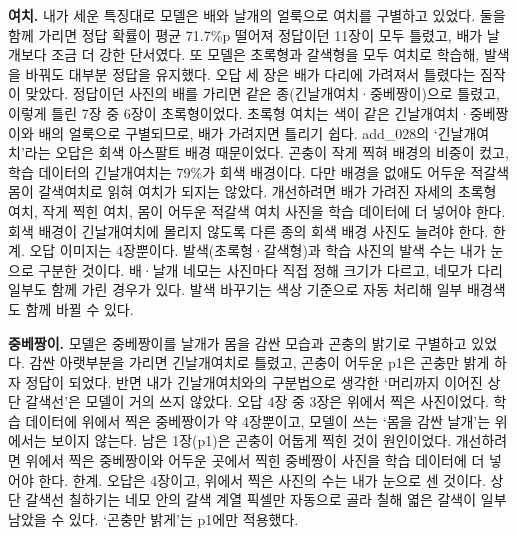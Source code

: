 \documentclass[11pt]{article}
\begin{document}
\textbf{여치.} 내가 세운 특징대로 모델은 배와 날개의 얼룩으로 여치를 구별하고 있었다. 둘을 함께 가리면 정답 확률이 평균 71.7\%p 떨어져 정답이던 11장이 모두 틀렸고, 배가 날개보다 조금 더 강한 단서였다. 또 모델은 초록형과 갈색형을 모두 여치로 학습해, 발색을 바꿔도 대부분 정답을 유지했다.
오답 세 장은 배가 다리에 가려져서 틀렸다는 짐작이 맞았다. 정답이던 사진의 배를 가리면 같은 종(긴날개여치·중베짱이)으로 틀렸고, 이렇게 틀린 7장 중 6장이 초록형이었다. 초록형 여치는 색이 같은 긴날개여치·중베짱이와 배의 얼룩으로 구별되므로, 배가 가려지면 틀리기 쉽다.
add\_028의 `긴날개여치'라는 오답은 회색 아스팔트 배경 때문이었다. 곤충이 작게 찍혀 배경의 비중이 컸고, 학습 데이터의 긴날개여치는 79\%가 회색 배경이다. 다만 배경을 없애도 어두운 적갈색 몸이 갈색여치로 읽혀 여치가 되지는 않았다.
개선하려면 배가 가려진 자세의 초록형 여치, 작게 찍힌 여치, 몸이 어두운 적갈색 여치 사진을 학습 데이터에 더 넣어야 한다. 회색 배경이 긴날개여치에 몰리지 않도록 다른 종의 회색 배경 사진도 늘려야 한다.
한계. 오답 이미지는 4장뿐이다. 발색(초록형·갈색형)과 학습 사진의 발색 수는 내가 눈으로 구분한 것이다. 배·날개 네모는 사진마다 직접 정해 크기가 다르고, 네모가 다리 일부도 함께 가린 경우가 있다. 발색 바꾸기는 색상 기준으로 자동 처리해 일부 배경색도 함께 바뀔 수 있다.

\textbf{중베짱이.} 모델은 중베짱이를 날개가 몸을 감싼 모습과 곤충의 밝기로 구별하고 있었다. 감싼 아랫부분을 가리면 긴날개여치로 틀렸고, 곤충이 어두운 p1은 곤충만 밝게 하자 정답이 되었다. 반면 내가 긴날개여치와의 구분법으로 생각한 `머리까지 이어진 상단 갈색선'은 모델이 거의 쓰지 않았다.
오답 4장 중 3장은 위에서 찍은 사진이었다. 학습 데이터에 위에서 찍은 중베짱이가 약 4장뿐이고, 모델이 쓰는 `몸을 감싼 날개'는 위에서는 보이지 않는다. 남은 1장(p1)은 곤충이 어둡게 찍힌 것이 원인이었다.
개선하려면 위에서 찍은 중베짱이와 어두운 곳에서 찍힌 중베짱이 사진을 학습 데이터에 더 넣어야 한다.
한계. 오답은 4장이고, 위에서 찍은 사진의 수는 내가 눈으로 센 것이다. 상단 갈색선 칠하기는 네모 안의 갈색 계열 픽셀만 자동으로 골라 칠해 엷은 갈색이 일부 남았을 수 있다. `곤충만 밝게'는 p1에만 적용했다.
\end{document}
